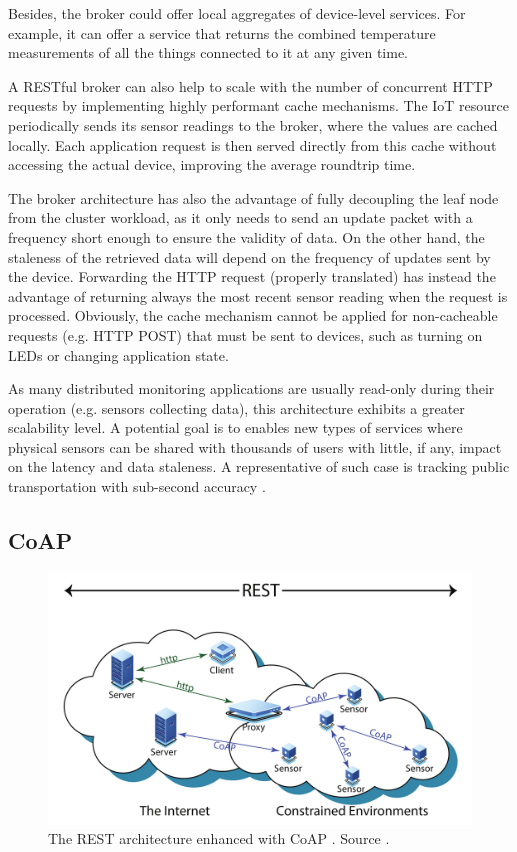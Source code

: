 Besides, the broker could offer local aggregates of device-level services. For example, it can offer a service that returns the combined temperature measurements of all the things connected to it at any given time.

A RESTful broker can also help to scale with the number of concurrent HTTP requests by implementing highly performant cache mechanisms. The IoT resource periodically sends its sensor readings to the broker, where the values are cached locally. Each application request is then served directly from this cache without accessing the actual device, improving the average roundtrip time.

The broker architecture has also the advantage of fully decoupling the leaf node from the cluster workload, as it only needs to send an update packet with a frequency short enough to ensure the validity of data. On the other hand, the staleness of the retrieved data will depend on the frequency of updates sent by the device. Forwarding the HTTP request (properly translated) has instead the advantage of returning always the most recent sensor reading when the request is processed. Obviously, the cache mechanism cannot be applied for non-cacheable requests (e.g. HTTP POST) that must be sent to devices, such as turning on LEDs or changing application state.

As many distributed monitoring applications are usually read-only during their operation (e.g. sensors collecting data), this architecture exhibits a greater scalability level. A potential goal is to enables new types of services where physical sensors can be shared with thousands of users with little, if any, impact on the latency and data staleness. A representative of such case is tracking public transportation with sub-second accuracy \cite{urllc}.

\subsection{CoAP}
\label{sec:coap}

\begin{figure}[h]
\centering
\includegraphics[width=\columnwidth]{figures/coap}
\caption{The REST architecture enhanced with CoAP \label{fig:coap}. Source \cite{coap}.}
\end{figure}

